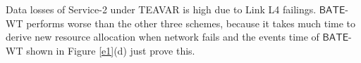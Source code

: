 \documentclass[sigconf]{acmart}
\begin{document}
Data losses of Service-2 under TEAVAR is high due to Link L4 failings.
$\mathsf{BATE}$-WT performs worse than the other three schemes, because it takes much time to derive new resource allocation when network fails and the events time of  $\mathsf{BATE}$-WT shown in Figure \ref{e1}(d) just prove this.







\end{document}
